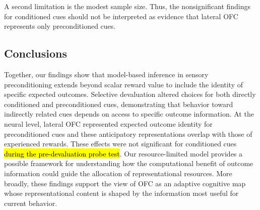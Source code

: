 \documentclass[9pt,twocolumn,twoside]{pnas-new}
\begin{document}
A second limitation is the modest sample size. Thus, the nonsignificant findings for conditioned cues should not be interpreted as evidence that lateral OFC represents only preconditioned cues.


\subsection*{Conclusions}

Together, our findings show that model-based inference in sensory preconditioning extends beyond scalar reward value to include the identity of specific expected outcomes. Selective devaluation altered choices for both directly conditioned and preconditioned cues, demonstrating that behavior toward indirectly related cues depends on access to specific outcome information. At the neural level, lateral OFC represented expected outcome identity for preconditioned cues and these anticipatory representations overlap with those of experienced rewards. These effects were not significant for conditioned cues \hl{during the pre-devaluation probe test}. Our resource-limited model provides a possible framework for understanding how the computational benefit of outcome information could guide the allocation of representational resources. More broadly, these findings support the view of OFC as an adaptive cognitive map whose representational content is shaped by the information most useful for current behavior.
\end{document}
